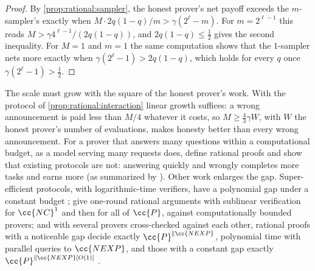 \begin{refsection}

\begin{proof}
By \cref{prop:rational:sampler}, the honest prover's net payoff exceeds the $m$-sampler's exactly when $M\cdot2q(1-q)/m>\gamma(2^\ell-m)$. For $m=2^{\ell-1}$ this reads $M>\gamma4^{\ell-1}/(2q(1-q))$, and $2q(1-q)\le\frac12$ gives the second inequality. For $M=1$ and $m=1$ the same computation shows that the $1$-sampler nets more exactly when $\gamma(2^\ell-1)>2q(1-q)$, which holds for every $q$ once $\gamma(2^\ell-1)>\frac12$.
\end{proof}

The scale must grow with the square of the honest prover's work. With the protocol of \cref{prop:rational:interaction} linear growth suffices: a wrong announcement is paid less than $M/4$ whatever it costs, so $M\ge\frac43\gamma W$, with $W$ the honest prover's number of evaluations, makes honesty better than every wrong announcement. For a prover that answers many questions within a computational budget, as a model serving many requests does, \textcite{CampanelliGennaro2015} define  rational proofs and show that existing protocols are not: answering quickly and wrongly completes more tasks and earns more (as summarized by \textcite{Campanelli2018}). Other work enlarges the gap. Super-efficient protocols, with logarithmic-time verifiers, have a polynomial gap under a constant budget \parencite{AzarMicali2013,ChenMcCauleySingh2018}; \textcite{GuoEtAl2014,GuoEtAl2016} give one-round rational arguments with sublinear verification for $\cc{NC}^1$ and then for all of $\cc{P}$, against computationally bounded provers; and with several provers cross-checked against each other, rational proofs with a noticeable gap decide exactly $\cc{P}^{\parallel\cc{NEXP}}$, polynomial time with parallel queries to $\cc{NEXP}$, and those with a constant gap exactly $\cc{P}^{\parallel\cc{NEXP}[O(1)]}$ \parencite{ChenMcCauleySingh2016}.


\end{refsection}
